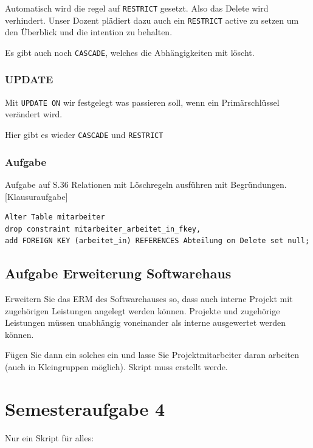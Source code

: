 \documentclass[a4paper]{article}
\begin{document}
Automatisch wird die regel auf \lstinline|RESTRICT| gesetzt. Also das Delete wird verhindert. Unser Dozent plädiert dazu auch ein \lstinline|RESTRICT| active zu setzen um den Überblick und die intention zu behalten.

Es gibt auch noch \lstinline|CASCADE|, welches die Abhängigkeiten mit löscht.

\subsubsection{UPDATE}

Mit \lstinline|UPDATE ON| wir festgelegt was passieren soll, wenn ein Primärschlüssel verändert wird.

Hier gibt es wieder \lstinline|CASCADE| und \lstinline|RESTRICT|

\subsubsection{Aufgabe}

Aufgabe auf S.36 Relationen mit Löschregeln ausführen mit Begründungen. [Klausuraufgabe]

\begin{lstlisting}
Alter Table mitarbeiter
drop constraint mitarbeiter_arbeitet_in_fkey,
add FOREIGN KEY (arbeitet_in) REFERENCES Abteilung on Delete set null;
\end{lstlisting}


\subsection{Aufgabe Erweiterung Softwarehaus}

Erweitern Sie das ERM des Softwarehauses so, dass auch interne Projekt mit zugehörigen Leistungen angelegt werden können. Projekte und zugehörige Leistungen müssen unabhängig voneinander als interne ausgewertet werden können. 

Fügen Sie dann ein solches ein und lasse Sie Projektmitarbeiter daran arbeiten (auch in Kleingruppen möglich). Skript muss erstellt werde.

\section{Semesteraufgabe 4}

Nur ein Skript für alles:
\end{document}
